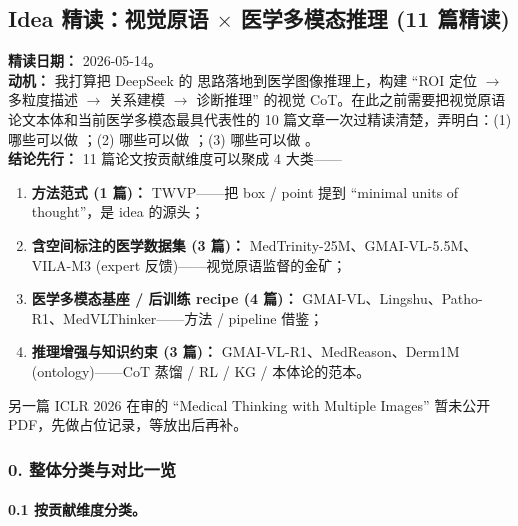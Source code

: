 \subsection*{Idea 精读：视觉原语 $\times$ 医学多模态推理 (11 篇精读)}
{}

\begin{conceptbox}
\textbf{精读日期：} 2026-05-14。\\
\textbf{动机：} 我打算把 DeepSeek 的  思路落地到医学图像推理上，构建 ``ROI 定位 $\to$ 多粒度描述 $\to$ 关系建模 $\to$ 诊断推理'' 的视觉 CoT。在此之前需要把视觉原语论文本体和当前医学多模态最具代表性的 10 篇文章一次过精读清楚，弄明白：(1) 哪些可以做 ；(2) 哪些可以做 ；(3) 哪些可以做 。\\
\textbf{结论先行：} 11 篇论文按贡献维度可以聚成 4 大类——
\begin{enumerate}[leftmargin=1.5em]
  \item \textbf{方法范式 (1 篇)：} TWVP——把 box / point 提到 ``minimal units of thought''，是 idea 的源头；
  \item \textbf{含空间标注的医学数据集 (3 篇)：} MedTrinity-25M、GMAI-VL-5.5M、VILA-M3 (expert 反馈)——视觉原语监督的金矿；
  \item \textbf{医学多模态基座 / 后训练 recipe (4 篇)：} GMAI-VL、Lingshu、Patho-R1、MedVLThinker——方法 / pipeline 借鉴；
  \item \textbf{推理增强与知识约束 (3 篇)：} GMAI-VL-R1、MedReason、Derm1M (ontology)——CoT 蒸馏 / RL / KG / 本体论的范本。
\end{enumerate}
另一篇 ICLR 2026 在审的 ``Medical Thinking with Multiple Images'' 暂未公开 PDF，先做占位记录，等放出后再补。
\end{conceptbox}

\subsubsection*{0. 整体分类与对比一览}

\paragraph{0.1 按贡献维度分类。}

